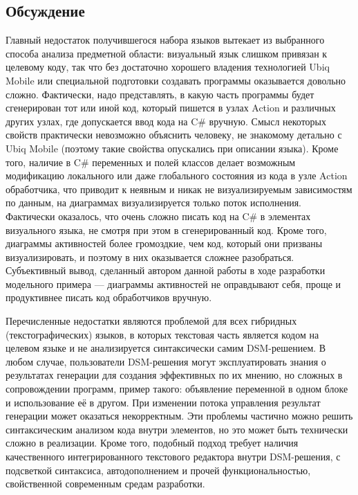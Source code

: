\subsection{Обсуждение}
Главный недостаток получившегося набора языков вытекает из выбранного способа анализа 
предметной области: визуальный язык слишком привязан к целевому коду, так что без 
достаточно хорошего владения технологией Ubiq Mobile или специальной подготовки создавать 
программы оказывается довольно сложно. Фактически, надо представлять, в какую часть программы 
будет сгенерирован тот или иной код, который пишется в узлах Action и различных других 
узлах, где допускается ввод кода на C\# вручную. Смысл некоторых свойств практически 
невозможно объяснить человеку, не знакомому детально с Ubiq Mobile (поэтому такие 
свойства опускались при описании языка). Кроме того, наличие в C\# переменных и полей 
классов делает возможным модификацию локального или даже глобального состояния из 
кода в узле Action обработчика, что приводит к неявным и никак не визуализируемым 
зависимостям по данным, на диаграммах визуализируется только поток исполнения. Фактически 
оказалось, что очень сложно писать код на C\# в элементах визуального языка, не смотря 
при этом в сгенерированный код. Кроме того, диаграммы активностей более громоздкие, 
чем код, который они призваны визуализировать, и поэтому в них оказывается сложнее 
разобраться. Субъективный вывод, сделанный автором данной работы в ходе разработки 
модельного примера --- диаграммы активностей не оправдывают себя, проще и продуктивнее 
писать код обработчиков вручную.

Перечисленные недостатки являются проблемой для всех гибридных (текстографических) 
языков, в которых текстовая часть является кодом на целевом языке и не анализируется 
синтаксически самим DSM-решением. В любом случае, пользователи DSM-решения могут эксплуатировать 
знания о результатах генерации для создания эффективных по их мнению, но сложных в 
сопровождении программ, пример такого: объявление переменной в одном блоке и использование 
её в другом. При изменении потока управления результат генерации может оказаться некорректным. 
Эти проблемы частично можно решить синтаксическим анализом кода внутри элементов, 
но это может быть технически сложно в реализации. Кроме того, подобный подход требует 
наличия качественного интегрированного текстового редактора внутри DSM-решения, с 
подсветкой синтаксиса, автодополнением и прочей функциональностью, свойственной современным 
средам разработки.

